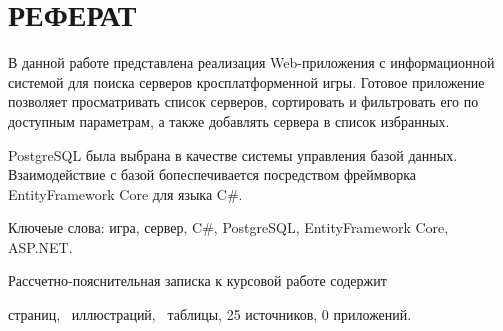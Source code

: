 \chapter*{РЕФЕРАТ}

В данной работе представлена реализация Web-приложения с информационной системой для поиска серверов кросплатформенной игры. Готовое приложение позволяет просматривать список серверов, сортировать и фильтровать его по доступным параметрам, а также добавлять сервера в список избранных.

PostgreSQL была выбрана в качестве системы управления базой данных. Взаимодействие с базой бопеспечивается посредством фреймворка EntityFramework Core для языка C\#.

Ключеые слова: игра, сервер, C\#, PostgreSQL, EntityFramework Core, ASP.NET.

Рассчетно-пояснительная записка к курсовой работе содержит \begin{NoHyper}\pageref{LastPage}\end{NoHyper} страниц, \totfig~иллюстраций, \tottab~таблицы, 25 источников, 0 приложений. %
